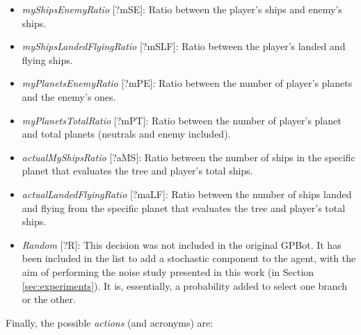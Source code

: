 \documentclass[conference]{IEEEtran}
\begin{document}
\begin{itemize}
\item {\em myShipsEnemyRatio} [?mSE]: Ratio between the player's ships and enemy's ships.
\item {\em myShipsLandedFlyingRatio} [?mSLF]: Ratio between the player's landed and flying ships.
\item {\em myPlanetsEnemyRatio} [?mPE]: Ratio between the number of player's planets and the enemy's ones.
\item {\em myPlanetsTotalRatio} [?mPT]: Ratio between the number of player's planet and total planets (neutrals and enemy included).
\item {\em actualMyShipsRatio} [?aMS]: Ratio between the number of ships in the specific planet that evaluates the tree and player's total ships.
\item {\em actualLandedFlyingRatio} [?maLF]: Ratio between the number of ships landed and flying from the specific planet that evaluates the tree and player's total ships.
\item {\em Random} [?R]: This decision was not included in the original GPBot. It has been included in the list to add a stochastic component to the agent, with the aim of performing the noise study presented in this work (in Section \ref{sec:experiments}). It is, essentially, a probability added to select one branch or the other.
\end{itemize}

Finally, the possible \textit{actions} (and acronyms) are:
\end{document}
